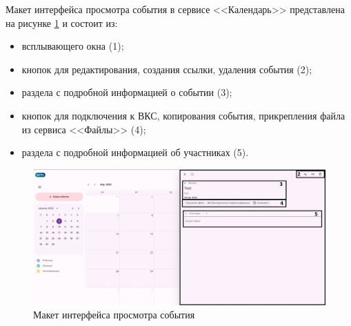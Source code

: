 Макет интерфейса просмотра события в сервисе <<Календарь>> представлена на рисунке \ref{templ:image3c} и состоит из:
\begin{itemize}
  \item всплывающего окна (1);
  \item кнопок для редактирования, создания ссылки, удаления события (2);
  \item раздела с подробной информацией о событии (3);
  \item кнопок для подключения к ВКС, копирования события, прикрепления файла из сервиса <<Файлы>> (4);
  \item раздела с подробной информацией об участниках (5).
\end{itemize}
\begin{figure}[H]
	\centering
	\includegraphics[width=1\linewidth]{images/календарь3}
	\caption{Макет интерфейса просмотра события}
	\label{templ:image3c}
\end{figure}

